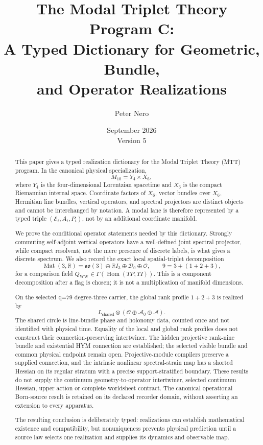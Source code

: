 \documentclass[11pt]{article}
\title{The Modal Triplet Theory Program C:\\
A Typed Dictionary for Geometric, Bundle,\\
and Operator Realizations}
\author{Peter Nero}
\date{September 2026\\Version 5}
\newcommand{\Ebundle}{\mathcal E}
\newcommand{\Lshared}{L_{\mathrm{shared}}}
\newcommand{\Atrace}{\mathcal A_0}
\newcommand{\Acover}{\mathcal A}
\newcommand{\WW}{Q_{\mathrm{WW}}}
\newcommand{\Dzero}{\mathcal D_0}
\newcommand{\Off}{\mathcal O}
\newcommand{\Hom}{\operatorname{Hom}}
\begin{document}
\maketitle

\begin{abstract}
This paper gives a typed realization dictionary for the Modal Triplet Theory
(MTT) program.  In the canonical physical specialization,
\[
 M_{10}=Y_4\times X_6,
\]
where $Y_4$ is the four-dimensional Lorentzian spacetime and $X_6$ is the
compact Riemannian internal space.  Coordinate factors of $X_6$, vector
bundles over $X_6$, Hermitian line bundles, vertical operators, and spectral
projectors are distinct objects and cannot be interchanged by notation.  A
modal lane is therefore represented by a typed triple
$(\Ebundle_i,A_i,P_i)$, not by an additional coordinate manifold.

We prove the conditional operator statements needed by this dictionary.
Strongly commuting self-adjoint vertical operators have a well-defined joint
spectral projector, while compact resolvent, not the mere presence of
discrete labels, is what gives a discrete spectrum.  We also record the exact
local spatial-triplet decomposition
\[
 \operatorname{Mat}(3,\mathbb R)
 =
 \mathfrak{so}(3)\oplus
 \mathbb RI_3\oplus\Dzero\oplus\Off,
 \qquad 9=3+(1+2+3),
\]
for a comparison field
$\WW\in\Gamma(\Hom(TP,TI))$.  This is a component decomposition after a flag
is chosen; it is not a multiplication of manifold dimensions.

On the selected q=79 degree-three carrier, the global rank profile
$1+2+3$ is realized by
\[
 \Lshared\otimes
 (\mathcal O\oplus\Atrace\oplus\Acover).
\]
The shared circle is line-bundle phase and holonomy data, counted once and
not identified with physical time.  Equality of the local and global rank
profiles does not construct their connection-preserving intertwiner.  The
hidden projective rank-nine bundle and existential HYM connection are
established; the selected visible bundle and common physical endpoint
remain open. Projective-module compilers preserve a supplied connection,
and the intrinsic nonlinear spectral-strain map has a shorted Hessian on
its regular stratum with a precise support-stratified boundary. These
results do not supply the continuum geometry-to-operator intertwiner,
selected continuum Hessian, upper action or complete worldsheet contract.
The canonical operational Born-source result is retained on its declared
recorder domain, without asserting an extension to every apparatus.

The resulting conclusion is deliberately typed: realizations can establish
mathematical existence and compatibility, but nonuniqueness prevents physical
prediction until a source law selects one realization and supplies its
dynamics and observable map.
\end{abstract}
\end{document}
